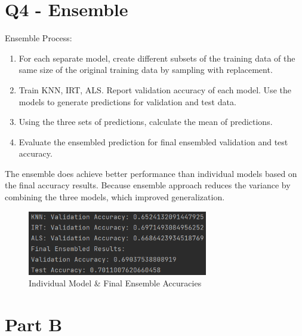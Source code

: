 \documentclass{article}
\begin{document}
\section*{Q4 - Ensemble}
Ensemble Process:
\begin{enumerate}
    \item For each separate model, create different subsets of the training data of the same size of the original training data by sampling with replacement. 
    \item Train KNN, IRT, ALS. Report validation accuracy of each model. Use the models to generate predictions for validation and test data.
    \item Using the three sets of predictions, calculate the mean of predictions.
    \item Evaluate the ensembled prediction for final ensembled validation and test accuracy.
\end{enumerate}
The ensemble does achieve better performance than individual models based on the final accuracy results. Because ensemble approach reduces the variance by combining the three models, which improved generalization.
\begin{figure}[H]
    \centering
    \includegraphics[width=0.7\textwidth]{4.png}
    \caption{Individual Model \& Final Ensemble Accuracies}
\end{figure}



\newpage
\section*{Part B}
\end{document}
